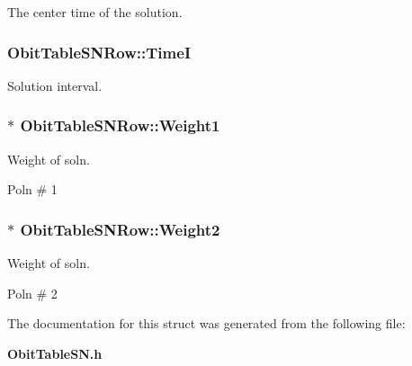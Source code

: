 The center time of the solution. 

\subsubsection{ {\bf Obit\-Table\-SNRow::Time\-I}}\label{structObitTableSNRow_o7}


Solution interval. 

\subsubsection{$\ast$ {\bf Obit\-Table\-SNRow::Weight1}}\label{structObitTableSNRow_o19}


Weight of soln. 

Poln \# 1 
\subsubsection{$\ast$ {\bf Obit\-Table\-SNRow::Weight2}}\label{structObitTableSNRow_o26}


Weight of soln. 

Poln \# 2 

The documentation for this struct was generated from the following file:\begin{CompactItemize}
\item 
{\bf Obit\-Table\-SN.h}\end{CompactItemize}
